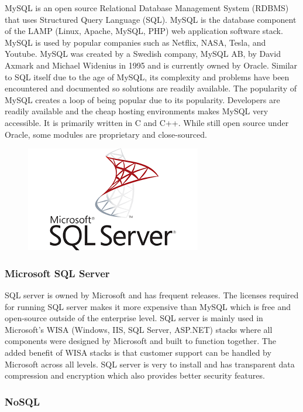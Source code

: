 \documentclass[12pt]{report}
\begin{document}
\begin{enumerate}
MySQL is an open source Relational Database Management System (RDBMS) that uses Structured Query Language (SQL).  MySQL is the database component of the LAMP (Linux, Apache, MySQL, PHP) web application software stack.  MySQL is used by popular companies such as Netflix, NASA, Tesla, and Youtube.  MySQL was created by a Swedish company, MySQL AB, by David Axmark and Michael Widenius in 1995 and is currently owned by Oracle.  Similar to SQL itself due to the age of MySQL, its complexity and problems have been encountered and documented so solutions are readily available.  The popularity of MySQL creates a loop of being popular due to its popularity.  Developers are readily available and the cheap hosting environments makes MySQL very accessible.  It is primarily written in C and C++.  While still open source under Oracle, some modules are proprietary and close-sourced.

\begin{figure}[h]
	\centering
	\includegraphics[width=0.251\linewidth]{microsoftsql}
\end{figure}

\subsubsection*{Microsoft SQL Server}

SQL server is owned by Microsoft and has frequent releases.  The licenses required for running SQL server makes it more expensive than MySQL which is free and open-source outside of the enterprise level.  SQL server is mainly used in Microsoft’s WISA (Windows, IIS, SQL Server, ASP.NET) stacks where all components were designed by Microsoft and built to function together.  The added benefit of WISA stacks is that customer support can be handled by Microsoft across all levels.  SQL server is very to install and has transparent data compression and encryption which also provides better security features.

\subsubsection*{NoSQL}


\end{enumerate}
\end{document}

